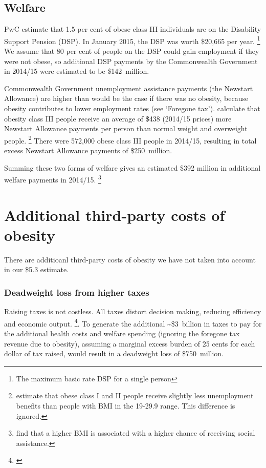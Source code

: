 \documentclass[embargoed]{grattan}
\begin{document}
\subsection{Welfare}\label{welfare}

PwC estimate that 1.5 per cent of obese class III individuals are on the Disability Support Pension (DSP).
In January 2015, the DSP was worth \$20,665 per year.%
\footnote{The maximum basic rate DSP for a single person} We assume that 80 per cent of people on the DSP could gain employment if they were not obese, so additional DSP payments by the Commonwealth Government in 2014/15 were estimated to be \$142~million.

Commonwealth Government unemployment assistance payments (the Newstart Allowance) are higher than would be the case if there was no obesity, because obesity contributes to lower employment rates (see `Foregone tax'). \textcite{Colagiuri2010costoverweightobesity} calculate that obesity class III people receive an average of \$438 (2014/15 prices) more Newstart Allowance payments per person than normal weight and overweight people.%
\footnote{\textcite{Colagiuri2010costoverweightobesity} estimate that obese class I and II people receive slightly less unemployment benefits than people with BMI in the 19-29.9 range.
This difference is ignored.} There were 572,000 obese class III people in 2014/15, resulting in total excess Newstart Allowance payments of \$250~million.

Summing these two forms of welfare gives an estimated \$392 million in additional welfare payments in 2014/15.%
\footnote{\textcite{Boeckerman2016EffectWeightLabor} find that a higher BMI is associated with a higher chance of receiving social assistance.}

\section{Additional third-party costs of obesity }\label{additional-third-party-costs-of-obesity}

There are additioanl third-party costs of obesity we have not taken into account in our \$5.3 estimate.

\subsubsection{Deadweight loss from higher taxes}\label{deadweight-loss-from-higher-taxes}

Raising taxes is not costless.
All taxes distort decision making, reducing efficiency and economic output.%
\footnote{\textcites[][Box~1]{Daley2015Propertytaxes}{Freebairn2010Taxationobesity}}. To generate the additional \textasciitilde{}\$3~billion in taxes to pay for the additional health costs and welfare spending (ignoring the foregone tax revenue due to obesity), assuming a marginal excess burden of 25 cents for each dollar of tax raised, would result in a deadweight loss of \$750~million.
\end{document}
